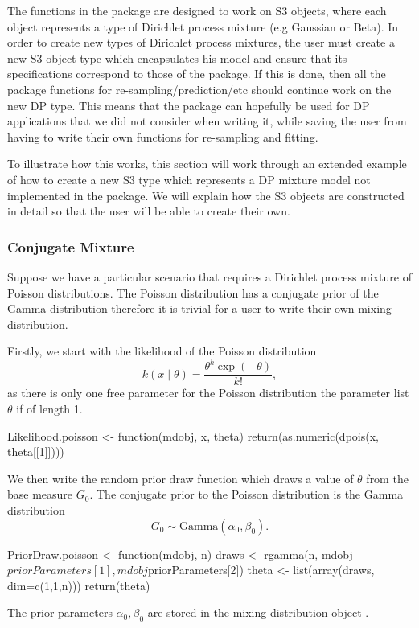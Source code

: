 \documentclass[nojss]{jss}
\begin{document}
The functions in the package are designed to work on S3  objects, where each object represents a type of Dirichlet process mixture (e.g Gaussian or Beta). In order to create new types of Dirichlet process mixtures, the user must create a new S3 object type which encapsulates his model and ensure that its specifications correspond to those of the package. If this is done, then all the package functions for re-sampling/prediction/etc should continue work on the new DP type. This means that the package can hopefully be used for DP applications that we did not consider when writing it, while saving the user from having to write their own functions for re-sampling and fitting.

To illustrate how this works, this section will work through an extended example of how to create a new S3 type which represents a DP mixture model not implemented in the  package. We will explain how the S3 objects are constructed in detail so that the user will be able to create their own.

\subsubsection{Conjugate Mixture}
Suppose we have a particular scenario that requires a Dirichlet process mixture of Poisson distributions. The Poisson distribution has a conjugate prior of the Gamma distribution therefore it is trivial for a user to write their own mixing distribution.

Firstly, we start with the likelihood of the Poisson distribution
\begin{equation*}
k(x \mid \theta) = \frac{\theta ^k \exp(-\theta)}{k!},
\end{equation*}
as there is only one free parameter for the Poisson distribution the parameter list $\theta$ if of length 1.
\begin{CodeInput}
Likelihood.poisson <- function(mdobj, x, theta){
  return(as.numeric(dpois(x, theta[[1]])))
}
\end{CodeInput}
We then write the random prior draw function which draws a value of $\theta$ from the base measure $G_0$. The conjugate prior to the Poisson distribution is the Gamma distribution
\begin{equation*}
G_0 \sim \text{Gamma} (\alpha _0, \beta _0).
\end{equation*}
\begin{CodeInput}
PriorDraw.poisson <- function(mdobj, n){
  draws <- rgamma(n, mdobj$priorParameters[1], mdobj$priorParameters[2])
  theta <- list(array(draws, dim=c(1,1,n)))
  return(theta)
 }
\end{CodeInput}
The prior parameters $\alpha_0, \beta_0$ are stored in the mixing distribution object .
\end{document}
